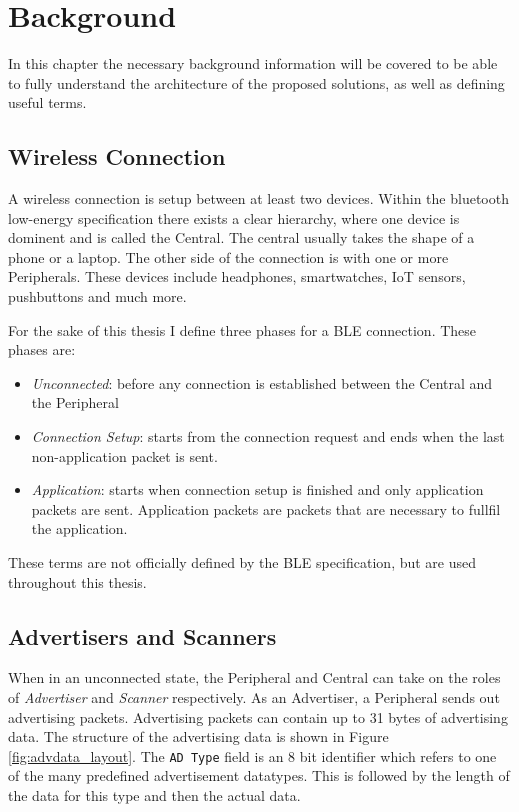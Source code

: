 \chapter{Background}
\label{chp:chapter_2}

In this chapter the necessary background information will be covered to be able to fully understand the architecture of the proposed solutions, as well as defining useful terms. 

\section{Wireless Connection}
\label{sec:ch2_wireless_connection}
A wireless connection is setup between at least two devices. Within the bluetooth low-energy specification there exists a clear hierarchy, where one device is dominent and is called the Central. The central usually takes the shape of a phone or a laptop. The other side of the connection is with one or more Peripherals. These devices include headphones, smartwatches, IoT sensors, pushbuttons and much more. 

For the sake of this thesis I define three phases for a BLE connection. These phases are:
\begin{itemize}
    \item \textit{Unconnected}: before any connection is established between the Central and the Peripheral
    \item \textit{Connection Setup}: starts from the connection request and ends when the last non-application packet is sent. 
    \item \textit{Application}: starts when connection setup is finished and only application packets are sent. Application packets are packets that are necessary to fullfil the application. 
\end{itemize}
These terms are not officially defined by the BLE specification, but are used throughout this thesis. 

\section{Advertisers and Scanners}
When in an unconnected state, the Peripheral and Central can take on the roles of \textit{Advertiser} and \textit{Scanner} respectively. As an Advertiser, a Peripheral sends out advertising packets. Advertising packets can contain up to 31 bytes of advertising data. The structure of the advertising data is shown in Figure \ref{fig:advdata_layout}. The \texttt{AD Type} field is an 8 bit identifier which refers to one of the many predefined advertisement datatypes. This is followed by the length of the data for this type and then the actual data. 

